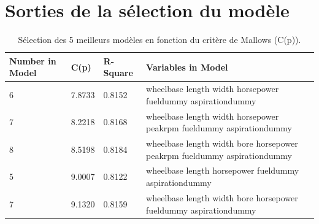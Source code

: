 \documentclass[11pt,a4paper]{article}
\begin{document}
\section{Sorties de la sélection du modèle}
\label{annex:selmodel}
\begin{table}[h]
	\small
	\begin{tabulary}{1\textwidth}{LlLJ}
		\hline
		
		Number in Model &    C(p) &    R-Square &    Variables in Model\\\hline
		
		6 &    7.8733 &    0.8152 &    wheelbase length width horsepower fueldummy aspirationdummy\\
		7 &    8.2218 &    0.8168 &    wheelbase length width horsepower peakrpm fueldummy aspirationdummy\\
		8 &    8.5198 &    0.8184 &    wheelbase length width bore horsepower peakrpm fueldummy aspirationdummy\\
		5 &    9.0007 &    0.8122 &    wheelbase length horsepower fueldummy aspirationdummy\\
		7 &    9.1320 &    0.8159 &    wheelbase length width bore horsepower fueldummy aspirationdummy\\\hline
		
	\end{tabulary}
	
	\caption{Sélection des 5 meilleurs modèles en fonction du critère de Mallows (C(p)).}
	\label{table:mallows}
\end{table}
\end{document}
